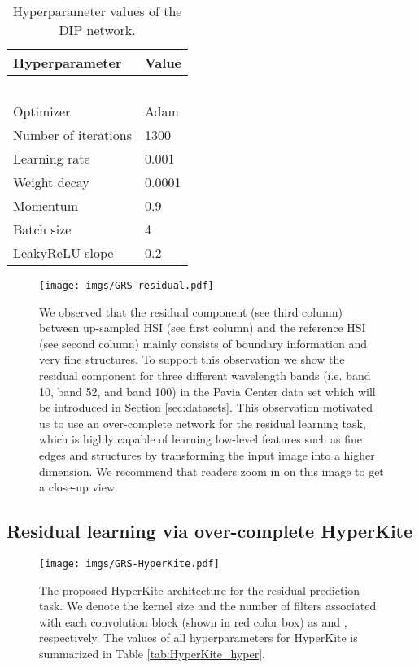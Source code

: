 \documentclass[journal]{IEEEtran}
\begin{document}
    \begin{table}[tb]
        \centering
        \caption{Hyperparameter values of the DIP network.}
        \begin{tabular}{ll}
            \hline
            Hyperparameter &  Value\\
            \hline
              & \\
             & \\
             & \\
             & \\
             & \\
            Optimizer       & Adam\\
            Number of iterations        & 1300\\
            Learning rate   & 0.001\\
            Weight decay    & 0.0001\\
            Momentum        & 0.9\\
            Batch size      & 4\\
            LeakyReLU slope & 0.2\\
            \hline
        \end{tabular}
        \label{tab:dip_hyper}
    \end{table}
    
    \begin{figure}[tb]
        \centering
        \texttt{[image: imgs/GRS-residual.pdf]}
        \caption{We observed that the residual component  (see third column) between up-sampled HSI  (see first column) and the reference HSI  (see second column) mainly consists of boundary information and very fine structures. To support this observation we show the residual component  for three different wavelength bands (i.e. band 10, band 52, and band 100) in the Pavia Center data set which will be introduced in Section \ref{sec:datasets}. 
        This observation motivated us to use an over-complete  network for the residual learning task, which is highly capable of learning low-level features such as fine edges and structures by transforming the input image into a higher dimension. We recommend that readers zoom in on this image to get a close-up view.}
        \label{fig: res_component}
    \end{figure}

\subsection{Residual learning via over-complete HyperKite}
    \label{sec:kiu-net}
    \begin{figure*}[tb]
        \centering
        \texttt{[image: imgs/GRS-HyperKite.pdf]}
        \caption{The proposed HyperKite architecture for the residual prediction task. We denote the  kernel size and the number of filters associated with each convolution block (shown in red color box) as  and , respectively. The values of all hyperparameters for  HyperKite is summarized in Table \ref{tab:HyperKite_hyper}.}
        \label{fig:HyperKite}
    \end{figure*}
    
\end{document}
